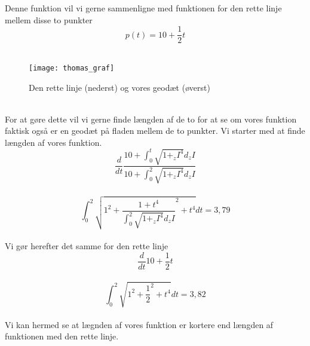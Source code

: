 Denne funktion vil vi gerne sammenligne med funktionen for den rette linje mellem disse to punkter \\
$$p(t)=10+ \frac{1}{2}t $$ \\
\begin{figure}
  \caption{Den rette linje (nederst) og vores geodæt (øverst)}
  \centering
    \texttt{[image: thomas\_graf]}
\end{figure} \\
For at gøre dette vil vi gerne finde længden af de to for at se om vores funktion faktisk også er en geodæt på fladen mellem de to punkter. Vi starter med at finde længden af vores funktion. \\
$$ \frac{d}{dt} \frac{10+\int_{0}^{t}\sqrt{1+_zI^4}d_zI}{10+\int_{0}^{2}\sqrt{1+_zI^4}d_zI}$$ \\
$$ \int_{0}^{2}\sqrt{1^2+ \frac{1+t^4}{\int_{0}^{2}\sqrt{1+_zI^4}d_zI}^2+t^4}dt=3,79  $$\\
Vi gør herefter det samme for den rette linje \\
$$ \frac{d}{dt}10+ \frac{1}{2}t $$\\
$$\int_{0}^{2}\sqrt{1^2+\frac{1}{2}^2+t^4}dt=3,82 $$\\
Vi kan hermed se at lægnden af vores funktion er kortere end længden af funktionen med den rette linje.
